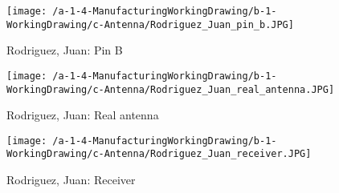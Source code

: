 \begin{figure}[h]
\caption{Rodriguez, Juan: Pin B}
\centering
\texttt{[image: /a-1-4-ManufacturingWorkingDrawing/b-1-WorkingDrawing/c-Antenna/Rodriguez\_Juan\_pin\_b.JPG]}
\end{figure}

\begin{figure}[h]
\caption{Rodriguez, Juan: Real antenna}
\centering
\texttt{[image: /a-1-4-ManufacturingWorkingDrawing/b-1-WorkingDrawing/c-Antenna/Rodriguez\_Juan\_real\_antenna.JPG]}
\end{figure}

\begin{figure}[h]
\caption{Rodriguez, Juan: Receiver}
\centering
\texttt{[image: /a-1-4-ManufacturingWorkingDrawing/b-1-WorkingDrawing/c-Antenna/Rodriguez\_Juan\_receiver.JPG]}
\end{figure}
